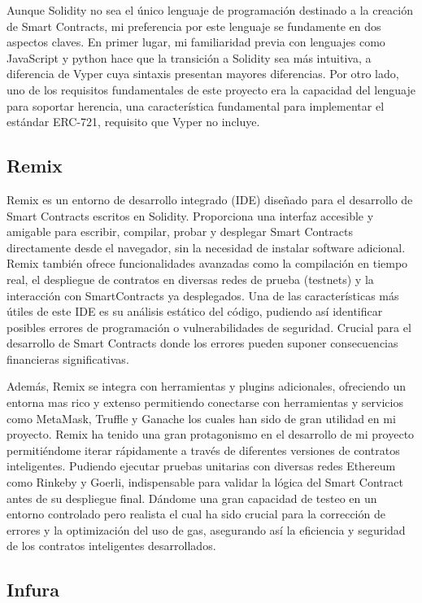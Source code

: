 Aunque Solidity no sea el único lenguaje de programación destinado a la creación de Smart Contracts, mi preferencia por este lenguaje se fundamente en dos aspectos claves.
En primer lugar, mi familiaridad previa con lenguajes como JavaScript y python hace que la transición a Solidity sea más intuitiva, a diferencia de Vyper cuya sintaxis presentan mayores diferencias.
Por otro lado, uno de los requisitos fundamentales de este proyecto era la capacidad del lenguaje para soportar herencia, una característica fundamental para implementar el estándar ERC-721, requisito que Vyper no incluye.


\subsection{Remix}

Remix es un entorno de desarrollo integrado (IDE) diseñado para el desarrollo de Smart Contracts escritos en Solidity. Proporciona una interfaz accesible y amigable para escribir, compilar, probar y desplegar Smart Contracts directamente desde el navegador, sin la necesidad de instalar software adicional.
Remix también ofrece funcionalidades avanzadas como la compilación en tiempo real, el despliegue de contratos en diversas redes de prueba (testnets) y la interacción con SmartContracts ya desplegados.
Una de las características más útiles de este IDE es su análisis estático del código, pudiendo así identificar posibles errores de programación o vulnerabilidades de seguridad. Crucial para el desarrollo de Smart Contracts donde los errores pueden suponer consecuencias financieras significativas.

Además, Remix se integra con herramientas y plugins adicionales, ofreciendo un entorna mas rico y extenso permitiendo conectarse con herramientas y servicios como MetaMask, Truffle y Ganache los cuales han sido de gran utilidad en mi proyecto.
Remix ha tenido una gran protagonismo en el desarrollo de mi proyecto permitiéndome iterar rápidamente a través de diferentes versiones de contratos inteligentes. Pudiendo ejecutar pruebas unitarias con diversas redes Ethereum como Rinkeby y Goerli, indispensable para validar la lógica del Smart Contract antes de su despliegue final. Dándome una gran capacidad de testeo en un entorno controlado pero realista el cual ha sido crucial para la corrección de errores y la optimización del uso de gas, asegurando así la eficiencia y seguridad de los contratos inteligentes desarrollados.


\subsection{Infura}

